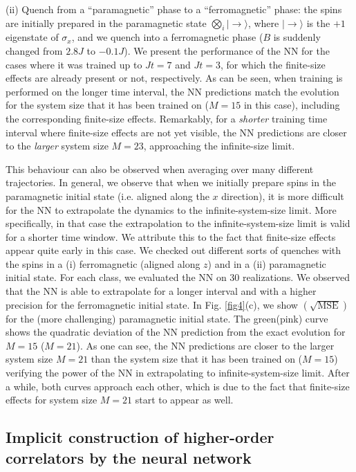 \documentclass[a4paper,aps,amsmath,amssymb,twocolumn,longbibliography,,accepted=2022-05-17]{quantumarticle}
\begin{document}
(ii) Quench from a ``paramagnetic'' phase to a ``ferromagnetic'' phase: the spins are initially prepared in the paramagnetic state $\bigotimes_i |\rightarrow\rangle$, where $|\rightarrow\rangle$ is the $+1$ eigenstate of $\sigma_x$, and we quench into a ferromagnetic phase ($B$ is suddenly changed from $2.8J$ to $-0.1J$). We present the performance of the NN for the cases where it was trained up to $Jt=7$ and $Jt=3$, for which the finite-size effects are already present or not, respectively. As can be seen, when training is performed on the longer time interval, the NN predictions  match the evolution for the system size that it has been trained on ($M=15$ in this case), including the corresponding finite-size effects. Remarkably, for a \textit{shorter} training time interval where finite-size effects are not yet visible, the NN predictions are closer to the \textit{larger} system size $M=23$, approaching the infinite-size limit.

This behaviour can also be observed when averaging over many different trajectories. In general, we observe that when we initially prepare spins in the paramagnetic initial state (i.e. aligned along the $x$ direction), it is more difficult for the NN to extrapolate the dynamics to the infinite-system-size limit. More specifically, in that case the extrapolation to the infinite-system-size limit is valid for a shorter time window. We attribute this to the fact that finite-size effects appear quite early in this case. We checked out different sorts of quenches with the spins in a (i) ferromagnetic (aligned along $z$) and in a (ii) paramagnetic initial state. For each class, we evaluated the NN on 30 realizations. We observed that the NN is able to extrapolate  for a longer interval and with a higher precision for the ferromagnetic initial state. In Fig. \ref{fig4}(c), we show $(\sqrt{\textrm{MSE}})$ for the (more challenging) paramagnetic initial state. The green(pink) curve shows the quadratic deviation of the NN prediction from the exact evolution for $M=15$ ($M=21$).  As one can see, the NN predictions are closer to the larger system size $M=21$ than the system size that it has been trained on ($M=15$) verifying the power of the NN in extrapolating to infinite-system-size limit. After a while, both curves approach each other, which is due to the fact that finite-size effects for system size $M=21$ start to appear as well.


\subsection{Implicit construction of higher-order correlators by the neural network\label{H-O-C}}
\end{document}
